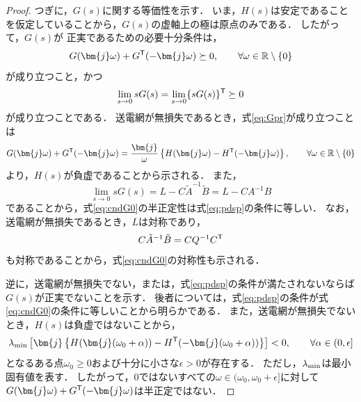 \documentclass[a4j,10pt,oneside,openany,dvipdfmx]{jsbook}
\begin{document}
\begin{proof}
つぎに，$G(s)$に関する等価性を示す．
いま，$H(s)$は安定であることを仮定していることから，$G(s)$の虚軸上の極は原点のみである．
したがって，$G(s)$が
正実であるための必要十分条件は，
\begin{equation}\label{eq:Gpr}
G(\bm{j}\omega) + G^{\sf T}(-\bm{j}\omega) \succeq 0
,\qquad \forall \omega \in \mathbb{R}\setminus\{0\}
\end{equation}
が成り立つこと，かつ
\begin{equation}\label{eq:cndG0}
\lim_{s\rightarrow 0} s G(s) = \lim_{s\rightarrow 0} \{ s G(s)\}^{\sf T}\succeq 0
\end{equation}
が成り立つことである．
送電網が無損失であるとき，式\eqref{eq:Gpr}が成り立つことは
\begin{equation}\label{eq:NIineq}
G(\bm{j}\omega) + G^{\sf T}(-\bm{j}\omega)
=
\frac{\bm{j}}{\omega} \left\{
H(\bm{j}\omega) - H^{\sf T}(-\bm{j}\omega)
\right\}
,\qquad \forall \omega \in \mathbb{R}\setminus\{0\}
\end{equation}
より，$H(s)$が負虚であることから示される．
また，
\[
\lim_{s\rightarrow 0} s G(s) =
L - C\tilde{A}^{-1}\tilde{B} = L - C A^{-1} B
\]
であることから，式\eqref{eq:cndG0}の半正定性は式\eqref{eq:pdsp}の条件に等しい．
なお，送電網が無損失であるとき，$L$は対称であり，
\[
C\tilde{A}^{-1}\tilde{B} = C Q^{-1} C^{\sf T}
\]
も対称であることから，式\eqref{eq:cndG0}の対称性も示される．

逆に，送電網が無損失でない，または，式\eqref{eq:pdsp}の条件が満たされないならば$G(s)$が正実でないことを示す．
後者については，式\eqref{eq:pdsp}の条件が式\eqref{eq:cndG0}の条件に等しいことから明らかである．
また，送電網が無損失でないとき，$H(s)$は負虚ではないことから，
\[
\lambda_{\rm min}\left[
\bm{j}
\left\{
H(\bm{j}(\omega_0 + \alpha )) - H^{\sf T}(-\bm{j}(\omega_0 + \alpha ))
\right\}
\right] < 0
,\qquad
\forall \alpha \in (0,\epsilon] 
\]
となるある点$\omega_0\geq 0$および十分に小さな$\epsilon >0$が存在する．
ただし，$\lambda_{\rm min}$は最小固有値を表す．
したがって，0ではないすべての$\omega \in (\omega_0, \omega_0+\epsilon] $に対して
$G(\bm{j} \omega) + G^{\sf T}(-\bm{j} \omega) $は半正定ではない．
\proofend
\end{proof}
\end{document}
